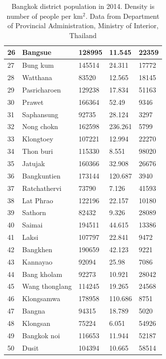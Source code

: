\documentclass[review]{elsarticle}
\begin{document}
\begin{table}[htbp]
{\begin{tabular}{|l|l|l|l|l|}
		\hline
		26 & Bangsue & 128995 & 11.545 & 22359\\
		\hline
		27 & Bung kum & 145514 & 24.311 & 17772\\
		\hline
		28 & Watthana & 83520 & 12.565 & 18145\\
		\hline
		29 & Pasricharoen & 129238 & 17.834 & 51163\\
		\hline
		30 & Prawet & 166364 & 52.49 & 9346\\
		\hline
		31 & Saphansung & 92735 & 28.124 & 3297\\
		\hline
		32 & Nong chokn & 162598 & 236.261 & 5799\\
		\hline
		33 & Klongtoey & 107221 & 12.994 & 22270\\
		\hline
		34 & Thon buri & 115330 & 8.551 & 98020\\
		\hline
		35 & Jatujak & 160366 & 32.908 & 26676\\
		\hline
		36 & Bangkuntien & 173144 & 120.687 & 3940\\
		\hline
		37 & Ratchathervi & 73790 & 7.126 & 41593\\
		\hline
		38 & Lat Phrao & 122196 & 22.157 & 10180\\
		\hline
		39 & Sathorn & 82432 & 9.326 & 28089\\
		\hline
		40 & Saimai & 194511 & 44.615 & 13386\\
		\hline
		41 & Laksi & 107797 & 22.841 & 9472\\
		\hline
		42 & Bangkhen & 190659 & 42.123 & 9221\\
		\hline
		43 & Kannayao & 92094 & 25.98 & 7086\\
		\hline
		44 & Bang kholam & 92273 & 10.921 & 28042\\
		\hline
		45 & Wang thonglang & 114245 & 19.265 & 24568\\
		\hline
		46 & Klongsamwa & 178958 & 110.686 & 8751\\
		\hline
		47 & Bangna & 94315 & 18.789 & 5020\\
		\hline
		48 & Klongsan & 75224 & 6.051 & 54926\\
		\hline
		49 & Bangkok noi & 116653 & 11.944 & 52187\\
		\hline
		50 & Dusit & 104394 & 10.665 & 58514\\
		\hline
	\end{tabular}
}
	\caption{Bangkok district population in 2014. Density is number of people per km$^{2}$. Data from Department of Provincial Administration, Ministry of Interior, Thailand }
\end{table}
\end{document}

